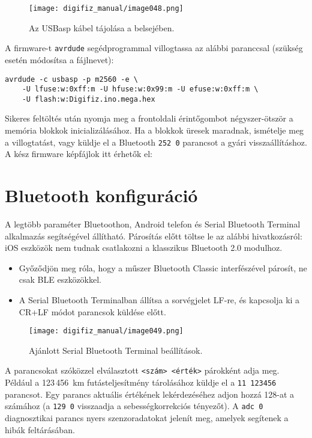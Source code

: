 \begin{figure}[htbp]
    \centering
    \texttt{[image: digifiz\_manual/image048.png]}
    \caption{Az USBasp kábel tájolása a \ReplicaGenOne{} belsejében.}
    \label{fig:usbasp-cable}
\end{figure}

A firmware-t \texttt{avrdude} segédprogrammal villogtassa az alábbi paranccsal (szükség esetén módosítsa a fájlnevet):

\begin{verbatim}
avrdude -c usbasp -p m2560 -e \
    -U lfuse:w:0xff:m -U hfuse:w:0x99:m -U efuse:w:0xff:m \
    -U flash:w:Digifiz.ino.mega.hex
\end{verbatim}

Sikeres feltöltés után nyomja meg a frontoldali érintőgombot négyszer-ötször a memória blokkok inicializálásához. Ha a blokkok üresek maradnak, ismételje meg a villogtatást, vagy küldje el a Bluetooth \verb|252 0| parancsot a gyári visszaállításhoz. A kész firmware képfájlok itt érhetők el:

\section{Bluetooth konfiguráció}
A legtöbb paraméter Bluetoothon, Android telefon és Serial Bluetooth Terminal alkalmazás segítségével állítható. Párosítás előtt töltse le az alábbi hivatkozásról:
iOS eszközök nem tudnak csatlakozni a klasszikus Bluetooth 2.0 modulhoz.

\begin{itemize}
    \item Győződjön meg róla, hogy a műszer Bluetooth Classic interfészével párosít, ne csak BLE eszközökkel.
    \item A Serial Bluetooth Terminalban állítsa a sorvégjelet LF-re, és kapcsolja ki a CR+LF módot parancsok küldése előtt.
\end{itemize}

\begin{figure}[htbp]
    \centering
    \texttt{[image: digifiz\_manual/image049.png]}
    \caption{Ajánlott Serial Bluetooth Terminal beállítások.}
    \label{fig:sbt-settings}
\end{figure}

A parancsokat szóközzel elválasztott \verb|<szám> <érték>| párokként adja meg. Például a 123\,456~km futásteljesítmény tárolásához küldje el a \verb|11 123456| parancsot. Egy parancs aktuális értékének lekérdezéséhez adjon hozzá 128-at a számához (a \verb|129 0| visszaadja a sebességkorrekciós tényezőt). A \verb|adc 0| diagnosztikai parancs nyers szenzoradatokat jelenít meg, amelyek segítenek a hibák feltárásában.

